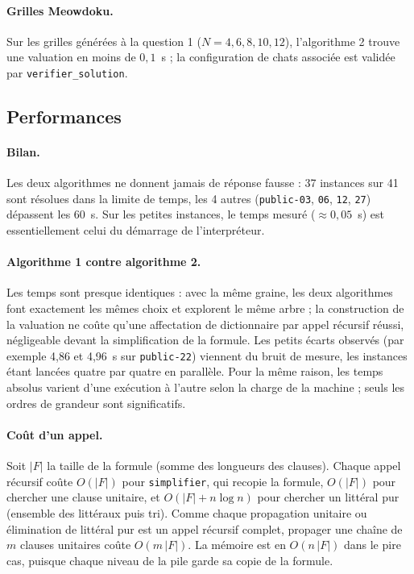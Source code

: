 \documentclass[11pt,a4paper]{article}
\begin{document}
\paragraph{Grilles Meowdoku.} Sur les grilles générées à la question 1 ($N=4,6,8,10,12$),
l'algorithme 2 trouve une valuation en moins de $0{,}1$~s ; la configuration de chats associée
est validée par \texttt{verifier\_solution}.

\subsection{Performances}

\paragraph{Bilan.} Les deux algorithmes ne donnent jamais de réponse fausse : 37 instances sur
41 sont résolues dans la limite de temps, les 4 autres (\texttt{public-03}, \texttt{06},
\texttt{12}, \texttt{27}) dépassent les 60~s. Sur les petites instances, le temps mesuré
($\approx0{,}05$~s) est essentiellement celui du démarrage de l'interpréteur.

\paragraph{Algorithme 1 contre algorithme 2.} Les temps sont presque identiques : avec la même
graine, les deux algorithmes font exactement les mêmes choix et explorent le même arbre ; la
construction de la valuation ne coûte qu'une affectation de dictionnaire par appel récursif
réussi, négligeable devant la simplification de la formule. Les petits écarts observés
(par exemple 4,86 et 4,96~s sur \texttt{public-22}) viennent du bruit de mesure, les instances
étant lancées quatre par quatre en parallèle. Pour la même raison, les temps absolus varient d'une
exécution à l'autre selon la charge de la machine ; seuls les ordres de grandeur sont
significatifs.

\paragraph{Coût d'un appel.} Soit $|F|$ la taille de la formule (somme des longueurs des
clauses). Chaque appel récursif coûte $O(|F|)$ pour \texttt{simplifier}, qui recopie la formule,
$O(|F|)$ pour chercher une clause unitaire, et $O(|F|+n\log n)$ pour chercher un littéral pur
(ensemble des littéraux puis tri). Comme chaque propagation unitaire ou élimination de littéral
pur est un appel récursif complet, propager une chaîne de $m$ clauses unitaires coûte
$O(m\,|F|)$. La mémoire est en $O(n\,|F|)$ dans le pire cas, puisque chaque niveau de la pile
garde sa copie de la formule.
\end{document}
